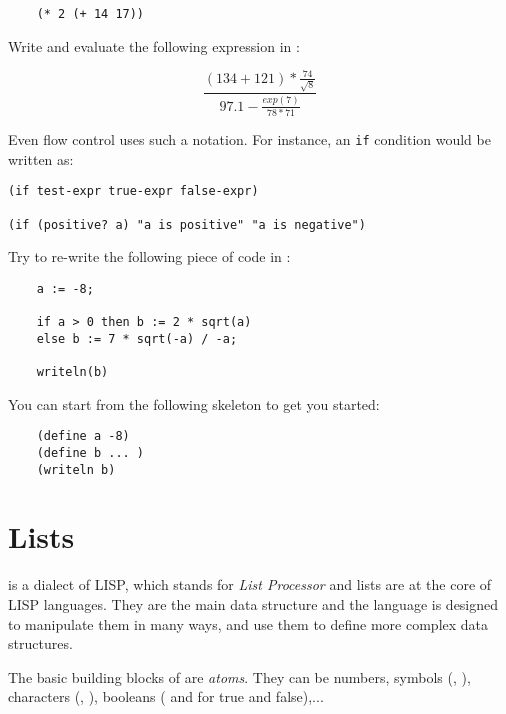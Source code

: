 \documentclass{../../../tp}
\begin{document}
\begin{verbatim}
	(* 2 (+ 14 17))
\end{verbatim}

\begin{instruction}

Write and evaluate the following expression in \scheme :

$$\frac{(134 + 121) * \frac{74}{\sqrt{8}}}{ 97.1 - \frac{exp(7)}{78 * 71} } $$
\end{instruction}

Even flow control uses such a notation. For instance, an \verb|if| condition would be written as:

\begin{verbatim}
(if test-expr true-expr false-expr)

(if (positive? a) "a is positive" "a is negative")
\end{verbatim}


\begin{instruction}
	
	Try to re-write the following \pascal piece of code in \scheme :
	
	\begin{verbatim}
	a := -8;
	
	if a > 0 then b := 2 * sqrt(a)
	else b := 7 * sqrt(-a) / -a;
	
	writeln(b)
	\end{verbatim}
	
	You can start from the following skeleton to get you started:
	
	\begin{verbatim}
	(define a -8)
	(define b ... )
	(writeln b)     
	\end{verbatim}
	
\end{instruction}




\section{Lists}

\scheme is a dialect of LISP, which stands for \emph{List Processor} and lists are at the core of LISP languages. They are the main data structure and the language is designed to manipulate them in many ways, and use them to define more complex data structures.

The basic building blocks of \scheme are \emph{atoms}. They can be numbers, symbols (, ), characters (\schemecode{#\a}, \schemecode{#\Z}), booleans ( and  for true and false),... 
\end{document}
